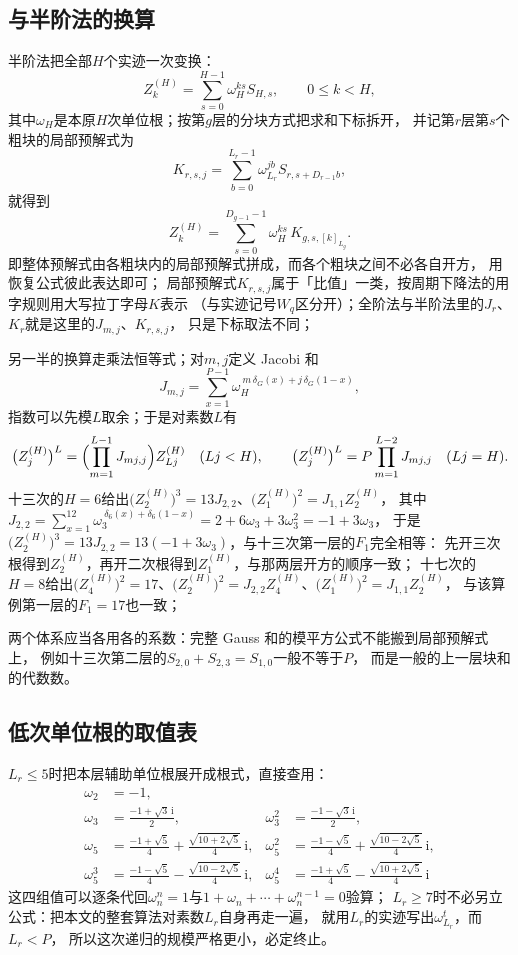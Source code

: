 \documentclass[UTF8,a4paper,11pt]{ctexart}
\newcommand{\ii}{\mathrm{i}}
\begin{document}
\subsection{与半阶法的换算}
半阶法把全部$H$个实迹一次变换：
\[
 Z^{(H)}_k=\sum_{s=0}^{H-1}\omega_H^{ks}S_{H,s},\qquad 0\le k<H,
\]
其中$\omega_H$是本原$H$次单位根；按第$g$层的分块方式把求和下标拆开，
并记第$r$层第$s$个粗块的局部预解式为
\[
 K_{r,s,j}=\sum_{b=0}^{L_r-1}\omega_{L_r}^{jb}S_{r,s+D_{r-1}b},
\]
就得到
\[
 Z^{(H)}_k=\sum_{s=0}^{D_{g-1}-1}\omega_H^{ks}\,K_{g,s,[k]_{L_g}}.
\]
即整体预解式由各粗块内的局部预解式拼成，而各个粗块之间不必各自开方，
用恢复公式彼此表达即可；
局部预解式$K_{r,s,j}$属于「比值」一类，按周期下降法的用字规则用大写拉丁字母$K$表示
（与实迹记号$W_q$区分开）；全阶法与半阶法里的$J_r$、$K_r$就是这里的$J_{m,j}$、$K_{r,s,j}$，
只是下标取法不同；\par

另一半的换算走乘法恒等式；对$m,j$定义 Jacobi 和
\[
 J_{m,j}=\sum_{x=1}^{P-1}\omega_H^{\ m\,\delta_G(x)+j\,\delta_G(1-x)},
\]
指数可以先模$L$取余；于是对素数$L$有
\[
 \bigl(Z^{(H)}_j\bigr)^{L}=\Bigl(\prod_{m=1}^{L-1}J_{mj,j}\Bigr)Z^{(H)}_{Lj}\quad(Lj<H),
 \qquad
 \bigl(Z^{(H)}_j\bigr)^{L}=P\prod_{m=1}^{L-2}J_{mj,j}\quad(Lj=H).
\]
十三次的$H=6$给出$\bigl(Z^{(H)}_2\bigr)^3=13J_{2,2}$、$\bigl(Z^{(H)}_1\bigr)^2=J_{1,1}Z^{(H)}_2$，
其中$J_{2,2}=\sum_{x=1}^{12}\omega_3^{\ \delta_6(x)+\delta_6(1-x)}=2+6\omega_3+3\omega_3^2=-1+3\omega_3$，
于是$\bigl(Z^{(H)}_2\bigr)^3=13J_{2,2}=13(-1+3\omega_3)$，与十三次第一层的$F_1$完全相等：
先开三次根得到$Z^{(H)}_2$，再开二次根得到$Z^{(H)}_1$，与那两层开方的顺序一致；
十七次的$H=8$给出$\bigl(Z^{(H)}_4\bigr)^2=17$、$\bigl(Z^{(H)}_2\bigr)^2=J_{2,2}Z^{(H)}_4$、$\bigl(Z^{(H)}_1\bigr)^2=J_{1,1}Z^{(H)}_2$，
与该算例第一层的$F_1=17$也一致；\par

两个体系应当各用各的系数：完整 Gauss 和的模平方公式不能搬到局部预解式上，
例如十三次第二层的$S_{2,0}+S_{2,3}=S_{1,0}$一般不等于$P$，
而是一般的上一层块和的代数数。
\subsection{低次单位根的取值表}
$L_r\le5$时把本层辅助单位根展开成根式，直接查用：
\begin{align*}
 \omega_2&=-1,\\
 \omega_3&=\frac{-1+\sqrt3\,\ii}{2},&
 \omega_3^2&=\frac{-1-\sqrt3\,\ii}{2},\\
 \omega_5&=\frac{-1+\sqrt5}{4}+\frac{\sqrt{10+2\sqrt5}}{4}\,\ii,&
 \omega_5^2&=\frac{-1-\sqrt5}{4}+\frac{\sqrt{10-2\sqrt5}}{4}\,\ii,\\
 \omega_5^3&=\frac{-1-\sqrt5}{4}-\frac{\sqrt{10-2\sqrt5}}{4}\,\ii,&
 \omega_5^4&=\frac{-1+\sqrt5}{4}-\frac{\sqrt{10+2\sqrt5}}{4}\,\ii
\end{align*}
这四组值可以逐条代回$\omega_n^n=1$与$1+\omega_n+\cdots+\omega_n^{n-1}=0$验算；
$L_r\ge7$时不必另立公式：把本文的整套算法对素数$L_r$自身再走一遍，
就用$L_r$的实迹写出$\omega_{L_r}^{t}$，而$L_r<P$，
所以这次递归的规模严格更小，必定终止。
\end{document}
